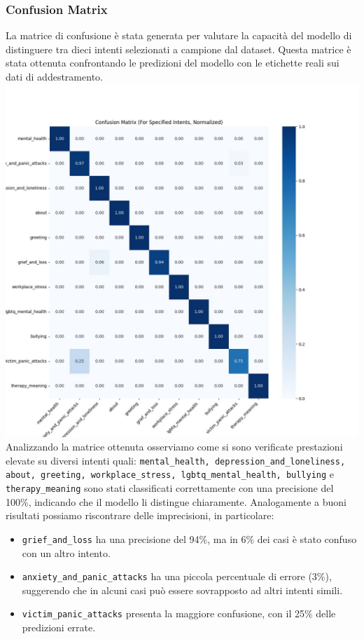 \documentclass[12pt, letterpaper]{article}
\begin{document}
\subsubsection{Confusion Matrix}
La matrice di confusione è stata generata per valutare la capacità del modello di distinguere tra dieci intenti selezionati a campione dal dataset. Questa matrice è stata ottenuta confrontando le predizioni del modello con le etichette reali sui dati di addestramento.
\includegraphics[width=1\textwidth]{immagini/cm.jpeg}\\
\newline
Analizzando la matrice ottenuta osserviamo come si sono verificate prestazioni elevate su diversi intenti quali: \texttt{mental\_health, depression\_and\_loneliness, about, greeting, workplace\_stress, lgbtq\_mental\_health, bullying} e \texttt{therapy\_meaning} sono stati classificati correttamente con una precisione del 100\%, indicando che il modello li distingue chiaramente.
Analogamente a buoni risultati possiamo riscontrare delle imprecisioni, in particolare:
\begin{itemize}
\item \texttt{grief\_and\_loss} ha una precisione del 94\%, ma in 6\% dei casi è stato confuso con un altro intento.
\item \texttt{anxiety\_and\_panic\_attacks} ha una piccola percentuale di errore (3\%), suggerendo che in alcuni casi può essere sovrapposto ad altri intenti simili.
\item \texttt{victim\_panic\_attacks} presenta la maggiore confusione, con il 25\% delle predizioni errate.
\end{itemize}
\end{document}
